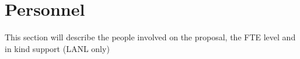 \section{Personnel}

This section will describe the people involved on the proposal, the FTE level and in kind support (LANL only)